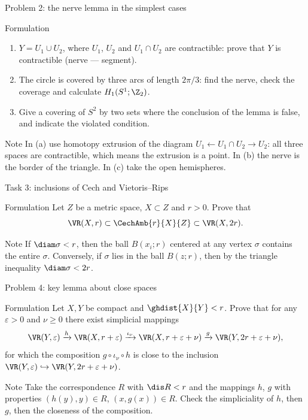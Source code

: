 \documentclass[aspectratio=169,11pt]{beamer}
\begin{document}
\begin{frame}{Problem \textup{2}: the nerve lemma in the simplest cases}
\begin{block}{Formulation}
\begin{enumerate}
\item[(a)] $Y = U_1 \cup U_2$, where $U_1$, $U_2$ and $U_1\cap U_2$ are contractible\textup{:} prove that $Y$ is contractible \textup{(}nerve --- segment\textup{)}.
\item[(b)] The circle is covered by three arcs of length $2\pi/3$\textup{:} find the nerve, check the coverage and calculate $H_1(S^1;\Z_2)$.
\item[(c)] Give a covering of $S^2$ by two sets where the conclusion of the lemma is false, and indicate the violated condition.
\end{enumerate}
\end{block}
\begin{block}{Note}
In \textup{(a)} use homotopy extrusion of the diagram $U_1 \leftarrow U_1\cap U_2 \rightarrow U_2$\textup{:} all three spaces are contractible, which means the extrusion is a point. In \textup{(b)} the nerve is the border of the triangle. In \textup{(c)} take the open hemispheres.
\end{block}
\end{frame}

\begin{frame}{Task \textup{3}: inclusions of Cech and Vietoris--Rips}
\begin{block}{Formulation}
Let $Z$ be a metric space, $X \subset Z$ and $r > 0$. Prove that
\[
\VR(X, r) \subset \CechAmb{r}{X}{Z} \subset \VR(X, 2r).
\]
\end{block}
\begin{block}{Note}
If $\diam\sigma < r$, then the ball $B(x_i;r)$ centered at any vertex $\sigma$ contains the entire $\sigma$. Conversely, if $\sigma$ lies in the ball $B(z;r)$, then by the triangle inequality $\diam\sigma < 2r$.
\end{block}
\end{frame}

\begin{frame}{Problem \textup{4}: key lemma about close spaces}
\begin{block}{Formulation}
Let $X, Y$ be compact and $\ghdist{X}{Y} < r$. Prove that for any $\varepsilon > 0$ and $\nu \ge 0$ there exist simplicial mappings
\[
\VR(Y, \varepsilon) \xrightarrow{h} \VR(X, r+\varepsilon) \xrightarrow{\iota_\nu} \VR(X, r+\varepsilon+\nu) \xrightarrow{g} \VR(Y, 2r+\varepsilon+\nu),
\]
for which the composition $g \circ \iota_\nu \circ h$ is close to the inclusion $\VR(Y,\varepsilon) \hookrightarrow \VR(Y, 2r+\varepsilon+\nu)$.
\end{block}
\begin{block}{Note}
Take the correspondence $R$ with $\dis R < r$ and the mappings $h$, $g$ with properties $(h(y),y) \in R$, $(x,g(x)) \in R$. Check the simpliciality of $h$, then $g$, then the closeness of the composition.
\end{block}
\end{frame}
\end{document}
